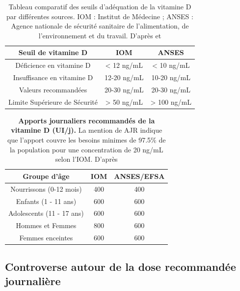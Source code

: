 \documentclass[
  a4paper,
  DIV=11,
  numbers=noendperiod,
  listof=totoc]{scrreprt}
\begin{document}
\begin{table}
\caption[\textbf{Tableau comparatif des seuils d'adéquation de la vitamine D par différentes sources.}]
{Tableau comparatif des seuils d'adéquation de la vitamine D par différentes sources. IOM : Institut de Médecine ; ANSES : Agence nationale de sécurité sanitaire de l’alimentation, de l’environnement et du travail. D'après \textcite{IOM.2011} et \textcite{ANSES.2021}}
\label{tbl-seuil}
\centering
\begin{tabular}{ccc}
\toprule
\textbf{Seuil de vitamine D} & \textbf{IOM} & \textbf{ANSES}\\
\midrule
Déficience en vitamine D & < 12 ng/mL & < 10 ng/mL\\
Insuffisance en vitamine D & 12-20 ng/mL & 10-20 ng/mL\\
Valeurs recommandées & 20-30 ng/mL & 20-30 ng/mL\\
Limite Supérieure de Sécurité & > 50 ng/mL  & > 100 ng/mL \\
\bottomrule
\end{tabular}
\end{table}

\begin{table}
\centering
\caption[{\textbf{Apports journaliers recommandés de la vitamine D (UI/j)}}]{\textbf{Apports journaliers recommandés de la vitamine D (UI/j).} La mention de \ac{AJR} indique que l'apport couvre les besoins minimes de 97.5\% de la population pour une concentration de 20 ng/mL selon l'\ac{IOM}. D'après \textcite{ANSES.2021, IOM.2011}}
\label{tbl-AJR}
\begin{tabular}{ccc}
\toprule
\textbf{Groupe d'âge} & \textbf{IOM} & \textbf{ANSES/EFSA} \\
\midrule
Nourrissons (0-12 mois) & 400 & 400 \\
Enfants (1 - 11 ans) & 600 & 600 \\
Adolescents (11 - 17 ans) & 600 & 600 \\
Hommes et Femmes & 800 & 600 \\
Femmes enceintes & 600 & 600 \\
\bottomrule
\end{tabular}
\end{table}

\hypertarget{controverse-autour-de-la-dose-recommanduxe9e-journaliuxe8re}{%
\subsection{Controverse autour de la dose recommandée
journalière}\label{controverse-autour-de-la-dose-recommanduxe9e-journaliuxe8re}}
\end{document}
